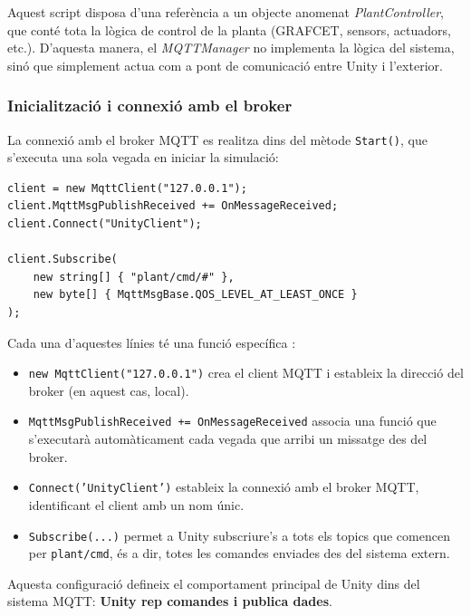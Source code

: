 \documentclass[12pt,a4paper]{report}
\begin{document}
Aquest script disposa d'una referència a un objecte anomenat \textit{PlantController}, que conté tota la lògica de control de la planta (GRAFCET, sensors, actuadors, etc.). D'aquesta manera, el \textit{MQTTManager} no implementa la lògica del sistema, sinó que simplement actua com a pont de comunicació entre Unity i l'exterior.

\subsubsection{Inicialització i connexió amb el broker}

La connexió amb el broker MQTT es realitza dins del mètode \texttt{Start()}, que s'executa una sola vegada en iniciar la simulació:

\begin{lstlisting}[language=CSharp, caption=Inicialització de la connexió MQTT]
client = new MqttClient("127.0.0.1");
client.MqttMsgPublishReceived += OnMessageReceived;
client.Connect("UnityClient");

client.Subscribe(
    new string[] { "plant/cmd/#" },
    new byte[] { MqttMsgBase.QOS_LEVEL_AT_LEAST_ONCE }
);
\end{lstlisting}

Cada una d'aquestes línies té una funció específica \cite{mqtt_unity_guide}:

\begin{itemize}
    \item \texttt{new MqttClient("127.0.0.1")} crea el client MQTT i estableix la direcció del broker (en aquest cas, local).
    
    \item \texttt{MqttMsgPublishReceived += OnMessageReceived} associa una funció que s'executarà automàticament cada vegada que arribi un missatge des del broker.
    
    \item \texttt{Connect('UnityClient')} estableix la connexió amb el broker MQTT, identificant el client amb un nom únic.
    
    \item \texttt{Subscribe(...)} permet a Unity subscriure's a tots els topics que comencen per \texttt{plant/cmd}, és a dir, totes les comandes enviades des del sistema extern.
\end{itemize}

Aquesta configuració defineix el comportament principal de Unity dins del sistema MQTT: \textbf{Unity rep comandes i publica dades}.
\end{document}
